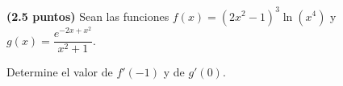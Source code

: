 
\textbf{(2.5 puntos)} Sean las funciones $f(x)=(2x^2-1)^3\ln(x^4)$ y $g(x)=\dfrac{e^{-2x+x^2}}{x^2+1}$.

Determine el valor de $f'(-1)$ y de $g'(0)$.
